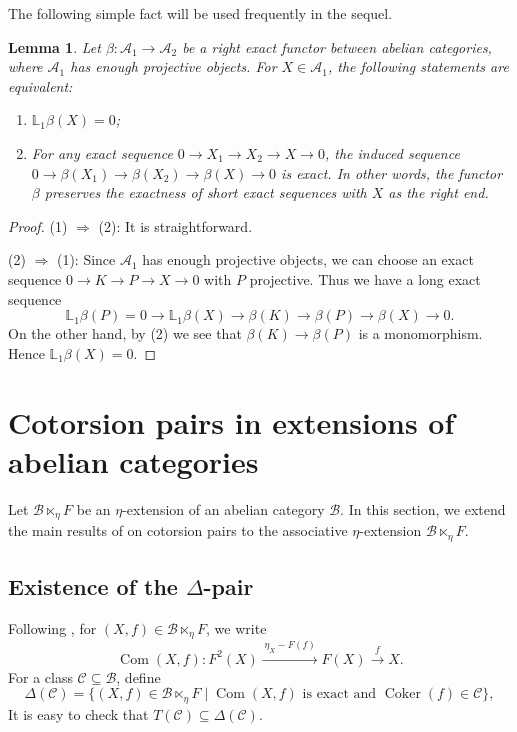\documentclass[11pt,reqno]{amsart}
\numberwithin{equation}{section}
\newtheorem{lemma}[theorem]{Lemma}
\newcommand{\cA}{\mathcal A}
\newcommand{\cB}{\mathcal B}
\newcommand{\cC}{\mathcal C}
\newcommand{\Coker}{\operatorname{Coker}}
\newcommand{\Com}{\operatorname{Com}}
\begin{document}
The following simple fact will be used frequently in the sequel.

\begin{lemma}\label{lem:L_1-seq}
Let $\beta\colon \cA_1\to \cA_2$ be a right exact functor between abelian categories, where $\cA_1$ has enough projective objects. For $X\in \cA_1$, the following
statements are equivalent:
\begin{enumerate}[label=\textup{(\arabic*)}]
\item $\mathbb{L}_1\beta(X)=0$;
\item For any exact sequence $0\rightarrow X_1\rightarrow X_2\rightarrow X\rightarrow 0$, the induced sequence
$0\rightarrow \beta(X_1)\rightarrow \beta(X_2)\rightarrow \beta(X)\rightarrow 0$ is exact. In other words, the functor $\beta$ preserves the exactness of short exact sequences with $X$
as the right end.
\end{enumerate}
\end{lemma}
\begin{proof}
{\rm (1) $\Rightarrow$ (2):} It is straightforward.

{\rm (2) $\Rightarrow$ (1):} Since $\cA_1$ has enough projective objects, we can choose an exact sequence $0\rightarrow K\rightarrow P\rightarrow X\rightarrow 0$ with $P$ projective.
Thus we have a long exact sequence
\[
\mathbb{L}_1\beta(P)=0\rightarrow \mathbb{L}_1\beta(X)\rightarrow \beta(K)\rightarrow \beta(P)\rightarrow \beta(X)\rightarrow 0.
\]
On the other hand, by {\rm (2)} we see that $\beta(K)\rightarrow \beta(P)$ is a monomorphism. Hence $\mathbb{L}_1\beta(X)=0$.
\end{proof}




\section{Cotorsion pairs in extensions of abelian categories}\label{section:extension}


Let $\cB\ltimes_\eta F$ be an $\eta$-extension of an abelian category $\cB$. In this section, we extend the main
results of \cite{Hu} on cotorsion pairs to the associative $\eta$-extension $\cB\ltimes_\eta F$.

\subsection{Existence of the \texorpdfstring{$\Delta$}{Delta}-pair} Following \cite{Hu}, for $(X,f)\in\cB\ltimes_\eta F$, we write
\[
\Com(X,f):
F^2(X)\xrightarrow{\,\eta_X-F(f)\,}F(X)\xrightarrow{\,f\,}X.
\]
For a class $\cC\subseteq\cB$, define
\[
\Delta(\cC)
 =\{(X,f)\in \cB\ltimes_\eta F \mid \Com(X,f)\text{ is exact and }\Coker(f)\in\cC\},
\]
It is easy to check that $T(\cC)\subseteq \Delta(\cC)$.
\end{document}
